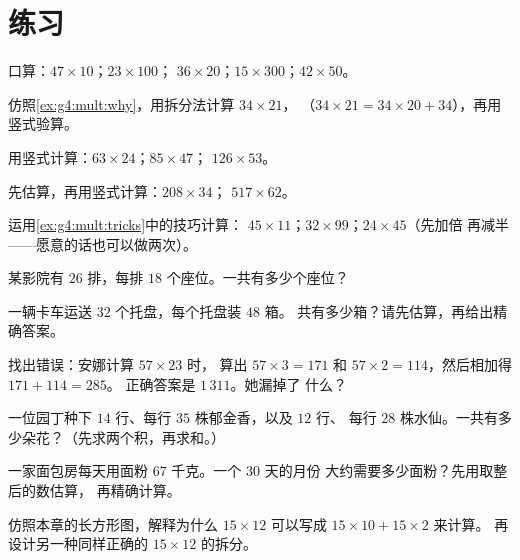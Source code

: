 \section{练习}

\begin{exercise}[$\star$]\label{exo:g4:mult:1}
口算：$47 \times 10$；\quad $23 \times 100$；\quad
$36 \times 20$；\quad $15 \times 300$；\quad $42 \times 50$。
\end{exercise}

\begin{exercise}[$\star$]\label{exo:g4:mult:2}
仿照\cref{ex:g4:mult:why}，用拆分法计算 $34 \times 21$，
（$34 \times 21 = 34 \times 20 + 34$），再用竖式验算。
\end{exercise}

\begin{exercise}[$\star$]\label{exo:g4:mult:3}
用竖式计算：$63 \times 24$；\quad $85 \times 47$；\quad
$126 \times 53$。
\end{exercise}

\begin{exercise}[$\star$]\label{exo:g4:mult:4}
先估算，再用竖式计算：$208 \times 34$；\quad
$517 \times 62$。
\end{exercise}

\begin{exercise}[$\star$]\label{exo:g4:mult:5}
运用\cref{ex:g4:mult:tricks}中的技巧计算：
$45 \times 11$；\quad $32 \times 99$；\quad $24 \times 45$（先加倍
再减半——愿意的话也可以做两次）。
\end{exercise}

\begin{exercise}[$\star$]\label{exo:g4:mult:6}
某影院有 $26$ 排，每排 $18$ 个座位。一共有多少个座位？
\end{exercise}

\begin{exercise}[$\star$]\label{exo:g4:mult:7}
一辆卡车运送 $32$ 个托盘，每个托盘装 $48$ 箱。
共有多少箱？请先估算，再给出精确答案。
\end{exercise}

\begin{exercise}[$\star$]\label{exo:g4:mult:8}
找出错误：安娜计算 $57 \times 23$ 时，
算出 $57 \times 3 = 171$ 和 $57 \times 2 = 114$，然后相加得 $171 + 114 = 285$。
正确答案是 $1\,311$。她漏掉了
什么？
\end{exercise}

\begin{exercise}[$\star\star$]\label{exo:g4:mult:9}
一位园丁种下 $14$ 行、每行 $35$ 株郁金香，以及 $12$ 行、
每行 $28$ 株水仙。一共有多少朵花？（先求两个积，再求和。）
\end{exercise}

\begin{exercise}[$\star\star$]\label{exo:g4:mult:10}
一家面包房每天用面粉 $67$ 千克。一个 $30$ 天的月份
大约需要多少面粉？先用取整后的数估算，
再精确计算。
\end{exercise}

\begin{exercise}[$\star\star$]\label{exo:g4:mult:11}
仿照本章的长方形图，解释为什么
$15 \times 12$ 可以写成 $15 \times 10 + 15 \times 2$ 来计算。
再设计另一种同样正确的 $15 \times 12$ 的拆分。
\end{exercise}
